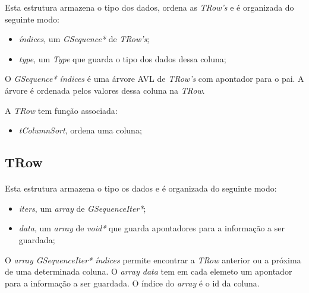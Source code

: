 \documentclass[a4paper, 10pt]{article}
\begin{document}
Esta estrutura armazena o tipo dos dados, ordena as \emph{TRow's} e é organizada do seguinte modo:
\begin{itemize}
	\item \emph{índices}, um \emph{GSequence*} de \emph{TRow's};
	\item \emph{type}, um \emph{Type} que guarda o tipo dos dados dessa coluna;
\end{itemize}
O \emph{GSequence* índices} é uma árvore AVL de \emph{TRow's} com apontador para o pai. A árvore é ordenada pelos valores dessa coluna na \emph{TRow}.

A \emph{TRow} tem função associada:
\begin{itemize}
	\item \emph{tColumnSort}, ordena uma coluna;
\end{itemize}

\subsection{TRow}
\label{sssec:Row}

\paragraph{ }

Esta estrutura armazena o tipo os dados e é organizada do seguinte modo:
\begin{itemize}
	\item \emph{iters}, um \emph{array} de \emph{GSequenceIter*};
	\item \emph{data}, um \emph{array} de \emph{void*} que guarda apontadores para a informação a ser guardada;
\end{itemize}
O \emph{array GSequenceIter* índices} permite encontrar a \emph{TRow} anterior ou a próxima de uma determinada coluna.
O \emph{array data} tem em cada elemeto um apontador para a informação a ser guardada. O índice do \emph{array} é o id da coluna.
\end{document}
